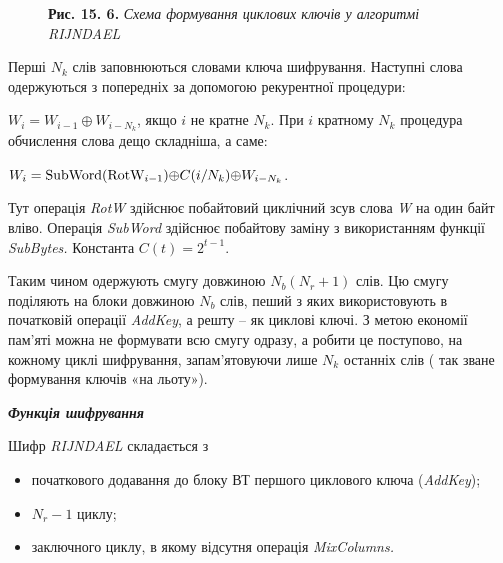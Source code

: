 \documentclass[a4paper]{article}
\newcommand\liststyleWWviiiNumxxxiii{%
\renewcommand\labelitemi{\textlatin{[F0B7?]}}
\renewcommand\labelitemii{o}
\renewcommand\labelitemiii{\textlatin{[F0A7?]}}
\renewcommand\labelitemiv{\textlatin{[F0B7?]}}
}
\newcounter{}
\newcommand\normalsubformula[1]{\text{\mathversion{normal}$#1$}}
\begin{document}
{\centering \par}

\begin{figure}
\centering
\begin{minipage}{}
{\centering
\textbf{Рис. 15. 6.} \textit{Схема формування циклових ключів у алгоритмі
}\textit{RIJNDAEL}
\par}
\end{minipage}
\end{figure}
Перші  ${N_{{k}}}$ слів заповнюються словами ключа шифрування. Наступні слова
одержуються з попередніх за допомогою рекурентної процедури:

 ${W_{{i}}=W_{{i-1}}{\oplus}W_{{i-N_{{k}}}}}$, якщо  ${i}$ не кратне 
${N_{{k}}}$. При  ${i}$ кратному  ${N_{{k}}}$ процедура обчислення слова дещо
складніша, а саме:

{\centering

${W_{{i}}=\normalsubformula{\text{SubWord}}(\normalsubformula{\text{RotW}}_{{i-1}}){\oplus}C(i/N_{{k}}){\oplus}W_{{i-N_{{k}}}}}$.
\par}

Тут операція\textit{ }\textit{RotW} здійснює побайтовий циклічний зсув слова
\textit{W}\textit{ }на один байт вліво. Операція \textit{SubWord} здійснює
побайтову заміну з використанням функції \textit{SubBytes}\textit{.} Константа 
${C(t)=2^{{t-1}}}$.

Таким чином одержують смугу довжиною  ${N_{{b}}(N_{{r}}+1)}$ слів. Цю смугу
поділяють на блоки довжиною  ${N_{{b}}}$ слів, пеший з яких використовують в
початковій операції \textit{AddKey}, а решту – як циклові ключі. З метою
економії пам’яті можна не формувати всю смугу одразу, а робити це поступово, на
кожному циклі шифрування, запам’ятовуючи лише  ${N_{{k}}}$ останніх слів ( так
зване формування ключів «на льоту»).


\bigskip


\bigskip

{\centering\bfseries\itshape
Функція шифрування
\par}


\bigskip


\bigskip

Шифр \textit{RIJNDAEL} складається з 

\liststyleWWviiiNumxxxiii
\begin{itemize}
\item початкового додавання до блоку ВТ першого циклового ключа
(\textit{AddKey});
\item  ${N_{{r}}-1}$ циклу;
\item заключного циклу, в якому відсутня операція \textit{MixColumns.}
\end{itemize}
\end{document}
